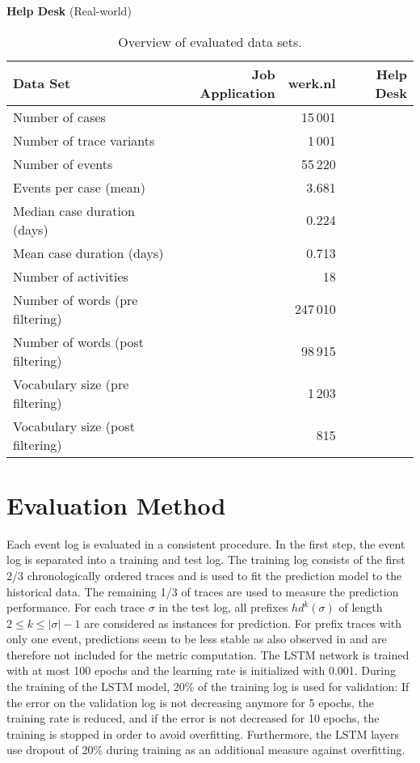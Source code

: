  
\textbf{Help Desk} (Real-world)

\begin{table}[!htbp]
	\begin{tabularx}{\textwidth}{l r r r}
		\toprule
		\textbf{Data Set} & \textbf{Job Application} & \textbf{werk.nl} &\textbf{Help Desk}  \\
		\midrule
		Number of cases & & 15\,001& \\
		Number of trace variants & & 1\,001 & \\
		Number of events & & 55\,220 & \\
		Events per case (mean) & & 3.681& \\
		Median case duration (days) & & 0.224& \\
		Mean case duration (days)&&  0.713 & \\
		Number of activities & & 18 & \\
		Number of words (pre filtering) & &247\,010 & \\
		Number of words (post filtering)  & &98\,915 & \\
		Vocabulary size (pre filtering) & & 1\,203 & \\
		Vocabulary size (post filtering) & & 815 & \\
		\bottomrule
	\end{tabularx}
	\caption[Overview of evaluated data sets]{Overview of evaluated data sets.}
	\label{tab:logs}
\end{table}

\section{Evaluation Method}

Each event log is evaluated in a consistent procedure.
In the first step, the event log is separated into a training and test log. 
The training log consists of the first 2/3 chronologically ordered traces and is used to fit the prediction model to the historical data.
The remaining 1/3 of traces are used to measure the prediction performance.
For each trace $\sigma$ in the test log, all prefixes $hd^k(\sigma)$ of length $2 \leq k \leq |\sigma| - 1$ are considered as instances for prediction.
For prefix traces with only one event, predictions seem to be less stable as also observed in \cite{DBLP:conf/caise/TaxVRD17} and are therefore not included for the metric computation.
The LSTM network is trained with at most 100 epochs and the learning rate is initialized with 0.001.
During the training of the LSTM model, 20\% of the training log is used for validation: If the error on the validation log is not decreasing anymore for 5 epochs, the training rate is reduced, and if the error is not decreased for 10 epochs, the training is stopped in order to avoid overfitting.
Furthermore, the LSTM layers use dropout \cite{DBLP:journals/corr/abs-1207-0580} of 20\% during training as an additional measure against overfitting.

